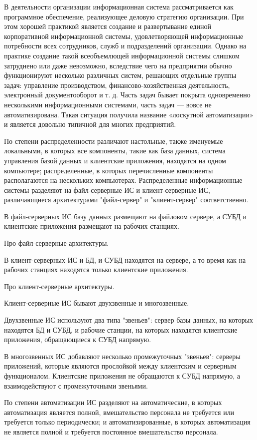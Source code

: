В деятельности организации информационная система рассматривается как программное обеспечение, реализующее деловую стратегию организации. При этом хорошей практикой является создание и развертывание единой корпоративной информационной системы, удовлетворяющей информационные потребности всех сотрудников, служб и подразделений организации. Однако на практике создание такой всеобъемлющей информационной системы слишком затруднено или даже невозможно, вследствие чего на предприятии обычно функционируют несколько различных систем, решающих отдельные группы задач: управление производством, финансово-хозяйственная деятельность, электронный документооборот и т. д. Часть задач бывает покрыта одновременно несколькими информационными системами, часть задач — вовсе не автоматизирована. Такая ситуация получила название «лоскутной автоматизации» и является довольно типичной для многих предприятий.

По степени распределенности различают настольные, также именуемые локальными, в которых все компоненты, такие как база данных, система управления базой данных и клиентские приложения, находятся на одном компьютере; распределенные, в которых перечисленные компоненты располагаются на нескольких компьютерах. Распределенные информационные системы разделяют на файл-серверные ИС и клиент-серверные ИС, различающиеся архитектурами "файл-сервер" и "клиент-сервер" соответственно.

В файл-серверных ИС базу данных размещают на файловом сервере, а СУБД и клиентские приложения размещают на рабочих станциях.

Про файл-серверные архитектуры.

В клиент-серверных ИС и БД, и СУБД находятся на сервере, а то время как на рабочих станциях находятся только клиентские приложения.

Про клиент-серверные архитектуры.

Клиент-серверные ИС бывают двухзвенные и многозвенные.

Двухзвенные ИС используют два типа "звеньев": сервер базы данных, на которых находятся БД и СУБД, и рабочие станции, на которых находятся клиентские приложения, обращающиеся к СУБД напрямую.

В многозвенных ИС добавляют несколько промежуточных "звеньев": серверы приложений, которые являются прослойкой между клиентским и серверным функционалом. Клиентские приложения не обращаются к СУБД напрямую, а взаимодействуют с промежуточными звеньями.

По степени автоматизации ИС разделяют на автоматические, в которых автоматизация является полной, вмешательство персонала не требуется или требуется только периодически; и автоматизированные, в которых автоматизация не является полной и требуется постоянное вмешательство персонала.

